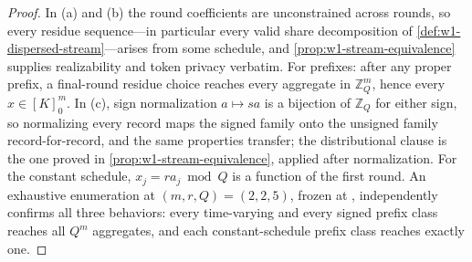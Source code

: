 \documentclass[aps,prx,reprint,floatfix,superscriptaddress]{revtex4-2}
\begin{document}
\begin{proof}
In (a) and (b) the round coefficients are unconstrained across rounds,
so every residue sequence---in particular every valid share
decomposition of \cref{def:w1-dispersed-stream}---arises from some
schedule, and \cref{prop:w1-stream-equivalence} supplies realizability
and token privacy verbatim.  For prefixes: after any proper prefix, a
final-round residue choice reaches every aggregate in $\mathbb Z_Q^m$,
hence every $x\in[K]_0^m$.  In (c), sign normalization $a\mapsto sa$ is
a bijection of $\mathbb Z_Q$ for either sign, so normalizing every
record maps the signed family onto the unsigned family
record-for-record, and the same properties transfer; the distributional
clause is the one proved in \cref{prop:w1-stream-equivalence}, applied
after normalization.  For the constant schedule, $x_j=ra_j\bmod Q$ is a
function of the first round.  An exhaustive enumeration at
$(m,r,Q)=(2,2,5)$, frozen at
, independently
confirms all three behaviors: every time-varying and every signed
prefix class reaches all $Q^m$ aggregates, and each constant-schedule
prefix class reaches exactly one.
\end{proof}
\end{document}
